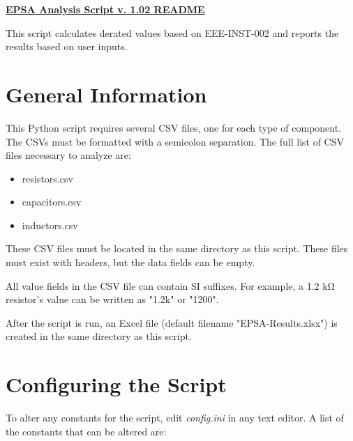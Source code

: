 \documentclass[12pt]{article}
\begin{document}

\begin{center}
    \huge{\textbf{\underline{EPSA Analysis Script v. 1.02 README}}}
\end{center}

This script calculates derated values based on EEE-INST-002 and reports the results based on user inputs.

\section{General Information}
This Python script requires several CSV files, one for each type of component. The CSVs must be formatted with a semicolon separation. The full list of CSV files necessary to analyze are:

\begin{itemize}
    \item resistors.csv
    \item capacitors.csv
    \item inductors.csv
\end{itemize}

These CSV files must be located in the same directory as this script. These files must exist with headers, but the data fields can be empty.

All value fields in the CSV file can contain SI suffixes. For example, a 1.2 kΩ resistor's value can be written as "1.2k" or "1200".

After the script is run, an Excel file (default filename "EPSA-Results.xlsx") is created in the same directory as this script.

\section{Configuring the Script}
To alter any constants for the script, edit \textit{config.ini} in any text editor. A list of the constants that can be altered are:
\end{document}
